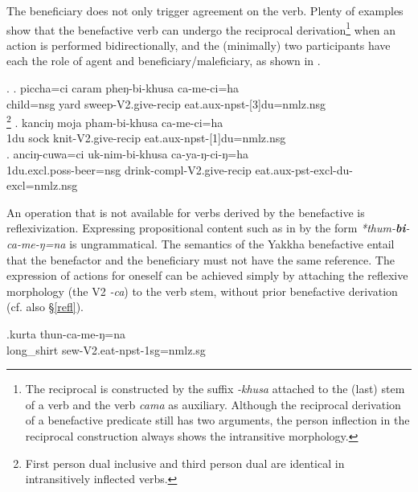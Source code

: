 The beneficiary does not only trigger agreement on the verb. Plenty of examples show that the benefactive verb can undergo the reciprocal derivation\footnote{The reciprocal is constructed by the suffix \emph{-khusa} attached to the (last) stem of a verb and the verb \emph{cama}  as auxiliary. Although the  reciprocal derivation of a benefactive predicate still has two arguments, the person inflection in the reciprocal construction always shows the intransitive morphology.} when an action is performed bidirectionally, and the (minimally) two participants have each the role of agent and beneficiary/maleficiary, as shown in \Next.  

\ex. \ag. piccha=ci caram pheŋ-bi-khusa ca-me-ci=ha\\
 child{\sc =nsg} yard sweep-{\sc V2.give-recip} eat{\sc .aux-npst-[3]du=nmlz.nsg}\\
\footnote{First person dual inclusive and third person dual are  identical in intransitively inflected verbs.}
\bg. kanciŋ moja pham-bi-khusa ca-me-ci=ha\\
 {\sc 1du} sock knit-{\sc V2.give-recip} eat{\sc .aux-npst-[1]du=nmlz.nsg}\\
 \bg. anciŋ-cuwa=ci uk-nim-bi-khusa ca-ya-ŋ-ci-ŋ=ha\\
 {\sc 1du.excl.poss}-beer{\sc =nsg} drink-{\sc compl-V2.give-recip} eat{\sc .aux-pst-excl-du-excl=nmlz.nsg}\\
 
 
An operation that is not available for verbs derived by the benefactive is reflexivization. Expressing propositional content such as in  \Next by the form \emph{*thum-\textbf{bi}-ca-me-ŋ=na} is ungrammatical. The semantics of the Yakkha benefactive entail that the benefactor and the beneficiary must not have the same reference. The expression of actions for oneself can be achieved simply by attaching the reflexive morphology (the V2 \emph{-ca}) to the verb stem, without prior benefactive derivation (cf. also §\ref{refl}).

\exg.kurta thun-ca-me-ŋ=na \\
	long\_shirt sew{\sc -V2.eat-npst-1sg=nmlz.sg} 	\\



